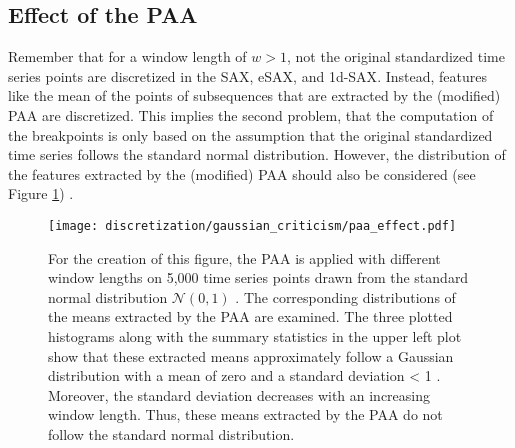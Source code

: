 \subsection*{Effect of the \ac{PAA}} \label{effect_paa}
Remember that for a window length of $w > 1$, not the original standardized time series points are discretized in the \ac{SAX}, \ac{eSAX}, and \ac{1d-SAX}. Instead, features like the mean of the points of subsequences that are extracted by the (modified) \ac{PAA} are discretized. This implies the second problem, that the computation of the breakpoints is only based on the assumption that the original standardized time series follows the standard normal distribution. However, the distribution of the features extracted by the (modified) \ac{PAA} should also be considered (see Figure \ref{fig:paa_effect}) \cite{SAX_Criticism}.
\newpage 
\begin{figure}[htb]
\centering
\texttt{[image: discretization/gaussian\_criticism/paa\_effect.pdf]}
\caption[Distribution of Means Extracted by the PAA]{For the creation of this figure, the \ac{PAA} is applied with different window lengths on 5,000 time series points drawn from the standard normal distribution $\mathcal{N}(0,1)$ \cite{SAX_Criticism}. The corresponding distributions of the means extracted by the \ac{PAA} are examined. The three plotted histograms along with the summary statistics in the upper left plot show that these extracted means approximately follow a Gaussian distribution with a mean of zero and a standard deviation < 1 \cite{SAX_Criticism}. Moreover, the standard deviation decreases with an increasing window length. Thus, these means extracted by the \ac{PAA} do not follow the standard normal distribution.}
\label{fig:paa_effect}
\end{figure}
